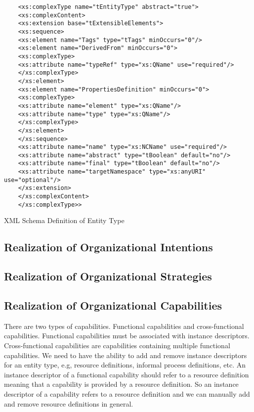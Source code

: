 \begin{Listing}
	\begin{lstlisting}
	<xs:complexType name="tEntityType" abstract="true">
	<xs:complexContent>
	<xs:extension base="tExtensibleElements">
	<xs:sequence>
	<xs:element name="Tags" type="tTags" minOccurs="0"/>
	<xs:element name="DerivedFrom" minOccurs="0">
	<xs:complexType>
	<xs:attribute name="typeRef" type="xs:QName" use="required"/>
	</xs:complexType>
	</xs:element>
	<xs:element name="PropertiesDefinition" minOccurs="0">
	<xs:complexType>
	<xs:attribute name="element" type="xs:QName"/>
	<xs:attribute name="type" type="xs:QName"/>
	</xs:complexType>
	</xs:element>
	</xs:sequence>
	<xs:attribute name="name" type="xs:NCName" use="required"/>
	<xs:attribute name="abstract" type="tBoolean" default="no"/>
	<xs:attribute name="final" type="tBoolean" default="no"/>
	<xs:attribute name="targetNamespace" type="xs:anyURI" use="optional"/>
	</xs:extension>
	</xs:complexContent>
	</xs:complexType>>
	\end{lstlisting}
	\caption{XML Schema Definition of Entity Type}
	\label{lst:xsdlist}
\end{Listing}

\subsection{Realization of Organizational Intentions}


\subsection{Realization of Organizational  Strategies}

\subsection{Realization of Organizational Capabilities}
There are two types of capabilities. Functional capabilities and cross-functional capabilities. Functional capabilities must be associated with instance descriptors. Cross-functional capabilities are capabilities containing multiple functional capabilities. We need to have the ability to add and remove instance descriptors for an entity type, e.g, resource definitions,  informal process definitions, etc. An instance descriptor of a functional capability should refer to a resource definition meaning that a capability is provided by a resource definition. So an instance descriptor of a capability refers to a resource definition and we can manually add and remove resource definitions in general.




